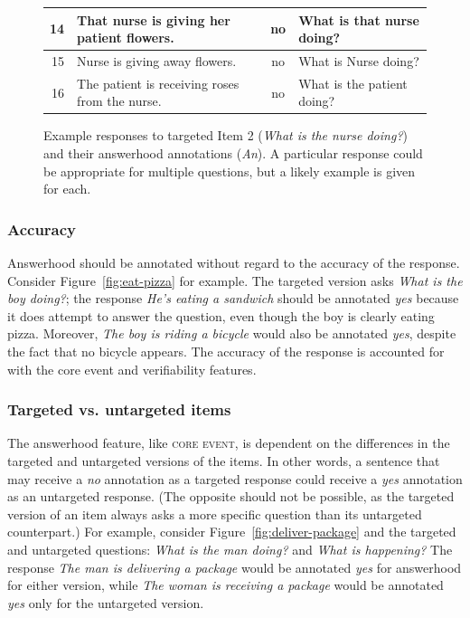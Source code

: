 \documentclass[12pt]{article}
\newcommand{\feat}[1]{\textsc{#1}}
\begin{document}
\begin{figure}[h!]
\begin{center}
\begin{tabular}{|r|l|c|l|}
\hline
14 & That nurse is giving her patient flowers. & no & What is that nurse doing? \\
\hline
15 & Nurse is giving away flowers. & no & What is Nurse doing? \\
\hline
16 & The patient is receiving roses from the nurse. & no & What is the patient doing?\\
\hline
\end{tabular}
\end{center}
\caption{Example responses to targeted Item 2 (\textit{What is the nurse doing?}) and their answerhood annotations (\textit{An}). A particular response could be appropriate for multiple questions, but a likely example is given for each.}
\label{fig:answerhood-examples}
\end{figure}
\clearpage


\subsubsection{Accuracy} Answerhood should be annotated without regard to the accuracy of the response. Consider Figure~\ref{fig:eat-pizza} for example. The targeted version asks \textit{What is the boy doing?}; the response \textit{He's eating a sandwich} should be annotated \textit{yes} because it does attempt to answer the question, even though the boy is clearly eating pizza. Moreover, \textit{The boy is riding a bicycle} would also be annotated \textit{yes}, despite the fact that no bicycle appears. The accuracy of the response is accounted for with the core event and verifiability features.

\subsubsection{Targeted vs. untargeted items} The answerhood feature, like \feat{core event}, is dependent on the differences in the targeted and untargeted versions of the items. In other words, a sentence that may receive a \textit{no} annotation as a targeted response could receive a \textit{yes} annotation as an untargeted response. (The opposite should not be possible, as the targeted version of an item always asks a more specific question than its untargeted counterpart.) For example, consider Figure~\ref{fig:deliver-package} and the targeted and untargeted questions: \textit{What is the man doing?} and \textit{What is happening?} The response \textit{The man is delivering a package} would be annotated \textit{yes} for answerhood for either version, while \textit{The woman is receiving a package} would be annotated \textit{yes} only for the untargeted version.
\end{document}
